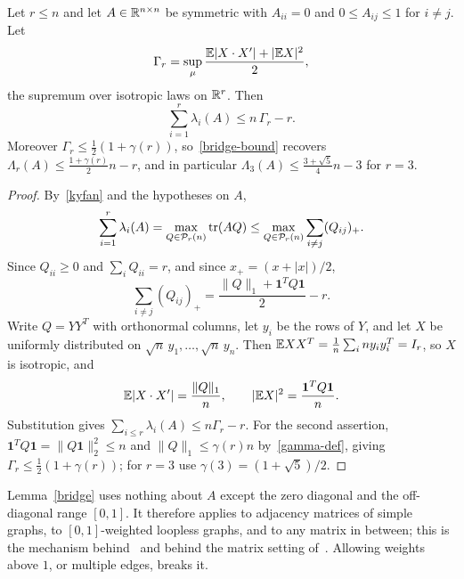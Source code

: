 \begin{lemma}\label{bridge}
Let $r\le n$ and let $A\in\mathbb R^{n\times n}$ be symmetric with $A_{ii}=0$ and
$0\le A_{ij}\le1$ for $i\ne j$. Let
\begin{equation}\label{gammar-def}
 \Gamma_r=\sup_\mu\frac{\mathbb E|X\cdot X'|+|\mathbb E X|^2}{2},
\end{equation}
the supremum over isotropic laws on $\mathbb R^r$. Then
\begin{equation}\label{bridge-bound}
 \sum_{i=1}^r\lambda_i(A)\le n\,\Gamma_r-r .
\end{equation}
Moreover $\Gamma_r\le\tfrac12(1+\gamma(r))$, so~\eqref{bridge-bound} recovers
$\Lambda_r(A)\le\tfrac{1+\gamma(r)}2n-r$, and in particular
$\Lambda_3(A)\le\tfrac{3+\sqrt5}4n-3$ for $r=3$.
\end{lemma}
\begin{proof}
By~\eqref{kyfan} and the hypotheses on $A$,
\[
 \sum_{i=1}^r\lambda_i(A)=\max_{Q\in\mathcal P_r(n)}\operatorname{tr}(AQ)
 \le\max_{Q\in\mathcal P_r(n)}\sum_{i\ne j}(Q_{ij})_+ .
\]
Since $Q_{ii}\ge0$ and $\sum_iQ_{ii}=r$, and since
$x_+=(x+|x|)/2$,
\[
 \sum_{i\ne j}(Q_{ij})_+
   =\frac{\|Q\|_1+\mathbf1^TQ\mathbf1}{2}-r .
\]
Write $Q=YY^T$ with orthonormal columns, let $y_i$ be the rows of $Y$, and let
$X$ be uniformly distributed on $\sqrt n\,y_1,\ldots,\sqrt n\,y_n$. Then
$\mathbb E XX^T=\tfrac1n\sum_i ny_iy_i^T=I_r$, so $X$ is isotropic, and
\[
 \mathbb E|X\cdot X'|=\frac{\|Q\|_1}{n},
 \qquad
 |\mathbb E X|^2=\frac{\mathbf1^TQ\mathbf1}{n}.
\]
Substitution gives $\sum_{i\le r}\lambda_i(A)\le n\Gamma_r-r$. For the second
assertion, $\mathbf1^TQ\mathbf1=\|Q\mathbf1\|_2^2\le n$ and
$\|Q\|_1\le\gamma(r)n$ by~\eqref{gamma-def}, giving
$\Gamma_r\le\tfrac12(1+\gamma(r))$; for $r=3$ use
$\gamma(3)=(1+\sqrt5)/2$.
\end{proof}
\begin{remark}\label{bridge-scope}
Lemma~\ref{bridge} uses nothing about $A$ except the zero diagonal and the
off-diagonal range $[0,1]$. It therefore applies to adjacency matrices of
simple graphs, to $[0,1]$-weighted loopless graphs, and to any matrix in
between; this is the mechanism behind~\cite[Proposition 6.1]{STW} and behind
the matrix setting of~\cite{Mohar}. Allowing weights above $1$, or multiple
edges, breaks it.
\end{remark}

